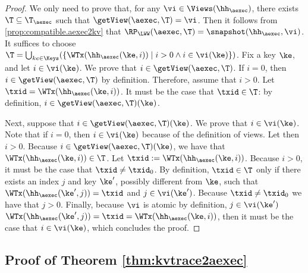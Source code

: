 \begin{proof}
We only need to prove that, for any $\vi \in \Views(\hh_{\aexec})$, there exists $\T \subseteq \T_{\aexec}$ such 
that $\getView(\aexec, \T) = \vi$. Then it follows from \cref{prop:compatible.aexec2kv} that 
$\RP_{\LWW}(\aexec, \T) = \snapshot(\hh_{\aexec}, \vi)$. It suffices to choose $\T = \bigcup_{ke \in \Keys}(\{ \WTx(\hh_{\aexec}(\ke, i)) \mid i > 0 
\wedge i \in \vi(\ke)\})$.
Fix a key $\ke$, and let $i \in \vi(\ke)$. We prove that $i \in \getView(\aexec, \T)$. 
If $i = 0$, then $i \in \getView(\aexec, \T)$ by definition. 
Therefore, assume that $i > 0$. Let $\txid = \WTx(\hh_{\aexec}(\ke, i))$. It must be the case that $\txid \in \T$: by 
definition, $i \in \getView(\aexec, \T)(\ke)$.

Next, suppose that $i \in \getView(\aexec, \T)(\ke)$. We prove that $i \in \vi(\ke)$.
Note that if $i = 0$, then $i \in \vi(\ke)$ because of the 
definition of views. Let then $i > 0$. Because $i \in \getView(\aexec, \T)(\ke)$, we have that 
$\WTx(\hh_{\aexec}(\ke, i)) \in \T$.  Let $\txid := \WTx(\hh_{\aexec}(\ke, i))$. Because $i > 0$, 
it must be the case that $\txid \neq \txid_0$.
By definition, $\txid \in \T$ only if there 
exists an index $j$ and key $\ke'$, possibly different from $\ke$, such that $\WTx(\hh_{\aexec}(\ke', j)) = \txid$ and $j \in \vi(\ke')$. 
Because $\txid \neq \txid_0$ we have that $j > 0$. Finally, because $\vi$ is atomic by definition, $j \in \vi(\ke')$
$\WTx(\hh_{\aexec}(\ke', j)) = \txid = \WTx(\hh_{\aexec}(\ke, i))$, then it must be the case 
that $i \in \vi(\ke)$, which concludes the proof.
\end{proof}

\subsection{Proof of Theorem \ref{thm:kvtrace2aexec}}

